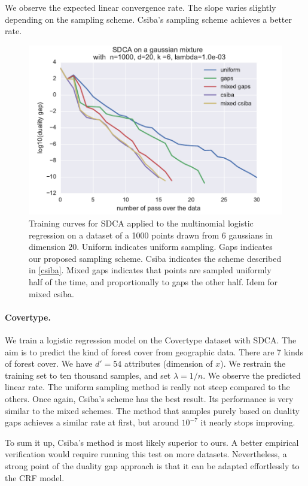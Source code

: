 \documentclass{article}
\DeclareMathOperator{\1}{\mathbb{1}}
\begin{document}
We observe the expected linear convergence rate.
The slope varies slightly depending on the sampling scheme.
Csiba's sampling scheme achieves a better rate.


\begin{figure}[ht]
	\center
	\includegraphics[width=.8\textwidth]{images/20170914_061831_gaussians_perf.pdf}
	\caption{Training curves for SDCA applied to the multinomial logistic regression on a dataset of a 1000 points drawn from 6 gaussians in dimension 20. Uniform indicates uniform sampling. Gaps indicates our proposed sampling scheme. Csiba indicates the scheme described in \ref{csiba}. Mixed gaps indicates that points are sampled uniformly half of the time, and proportionally to gaps the other half. Idem for mixed csiba.}
	\label{training gaussians}
\end{figure}


\paragraph{Covertype.}
We train a logistic regression model on the Covertype dataset \cite{blackard_comparative_1999} with SDCA.
The aim is to predict the kind of forest cover from geographic data. 
There are 7 kinds of forest cover.
We have $d'=54$ attributes (dimension of $x$).
We restrain the training set to ten thousand samples, and set $\lambda = 1/n$.
We observe the predicted linear rate.
The uniform sampling method is really not steep compared to the others. 
Once again, Csiba's scheme has the best result.
Its performance is very similar to the mixed schemes.
The method that samples purely based on duality gaps achieves a similar rate at first, but around $10^{-7}$ it nearly stops improving.

To sum it up, Csiba's method is most likely superior to ours.
A better empirical verification would require running this test on more datasets.
Nevertheless, a strong point of the duality gap approach is that it can be adapted effortlessly to the CRF model.
\end{document}
